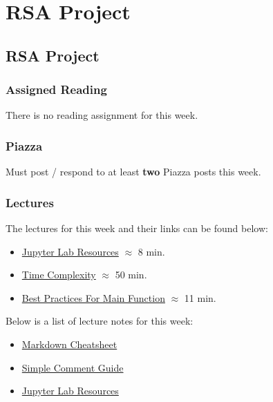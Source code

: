 \clearpage

\renewcommand{\ChapTitle}{RSA Project}
\renewcommand{\SectionTitle}{RSA Project}

\chapter{\ChapTitle}
\section{\SectionTitle}

\subsection{Assigned Reading}

There is no reading assignment for this week.

\subsection{Piazza}

Must post / respond to at least \textbf{two} Piazza posts this week.  

\subsection{Lectures}

The lectures for this week and their links can be found below:

\begin{itemize}
    \item \href{https://applied.cs.colorado.edu/mod/hvp/view.php?id=51743}{Jupyter Lab Resources} $\approx$ 8 min.
    \item \href{https://applied.cs.colorado.edu/mod/hvp/view.php?id=51746}{Time Complexity} $\approx$ 50 min.
    \item \href{https://www.youtube.com/watch?v=lOeIDvyRUQs}{Best Practices For Main Function} $\approx$ 11 min.
\end{itemize}

\noindent Below is a list of lecture notes for this week:

\begin{itemize}
    \item \href{https://github.com/adam-p/markdown-here/wiki/Markdown-Cheatsheet}{Markdown Cheatsheet}
    \item \href{https://realpython.com/python-comments-guide/}{Simple Comment Guide}
    \item \href{https://www.colorado.edu/cs/students/computing-resources-students}{Jupyter Lab Resources}
\end{itemize}

